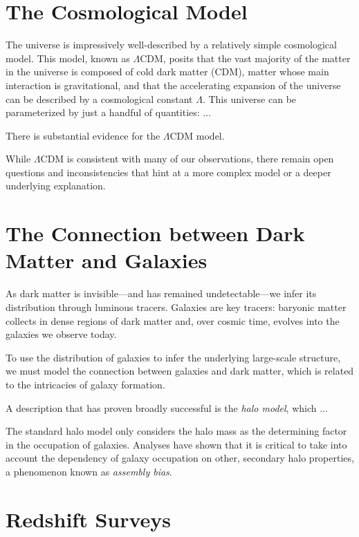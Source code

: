 \section{The Cosmological Model}

The universe is impressively well-described by a relatively simple cosmological model.
This model, known as $\Lambda$CDM, posits that the vast majority of the matter in the universe is composed of cold dark matter (CDM), matter whose main interaction is gravitational, and that the accelerating expansion of the universe can be described by a cosmological constant $\Lambda$.
This universe can be parameterized by just a handful of quantities: ... 

There is substantial evidence for the $\Lambda$CDM model.


While $\Lambda$CDM is consistent with many of our observations, there remain open questions and inconsistencies that hint at a more complex model or a deeper underlying explanation.



\section{The Connection between Dark Matter and Galaxies}

As dark matter is invisible---and has remained undetectable---we infer its distribution through luminous tracers.
Galaxies are key tracers: baryonic matter collects in dense regions of dark matter and, over cosmic time, evolves into the galaxies we observe today.

To use the distribution of galaxies to infer the underlying large-scale structure, we must model the connection between galaxies and dark matter, which is related to the intricacies of galaxy formation.

A description that has proven broadly successful is the \emph{halo model}, which ...

The standard halo model only considers the halo mass as the determining factor in the occupation of galaxies.
Analyses have shown that it is critical to take into account the dependency of galaxy occupation on other, secondary halo properties, a phenomenon known as \emph{assembly bias}.



\section{Redshift Surveys}

